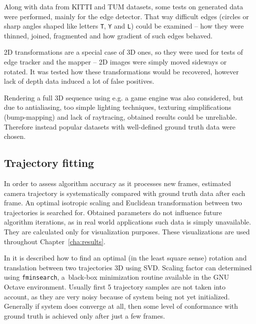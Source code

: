 Along with data from KITTI and TUM datasets, some tests on generated data were performed, mainly for the edge detector. That way difficult edges (circles or sharp angles shaped like letters \texttt{T}, \texttt{Y} and \texttt{L}) could be examined -- how they were thinned, joined, fragmented and how gradient of such edges behaved.

2D transformations are a special case of 3D ones, so they were used for tests of edge tracker and the mapper -- 2D images were simply moved sideways or rotated. It was tested how these transformations would be recovered, however lack of depth data induced a lot of false positives.

Rendering a full 3D sequence using e.g. a game engine was also considered, but due to antialiasing, too simple lighting techniques, texturing simplifications (bump-mapping) and lack of raytracing, obtained results could be unreliable. Therefore instead popular datasets with well-defined ground truth data were chosen.


\subsection{Trajectory fitting}
\label{sec:fitting}

In order to assess algorithm accuracy as it processes new frames, estimated camera trajectory is systematically compared with ground truth data after each frame. An optimal isotropic scaling and Euclidean transformation between two trajectories is searched for. Obtained parameters do not influence future algorithm iterations, as in real world applications such data is simply unavailable. They are calculated only for visualization purposes. These visualizations are used throughout Chapter~\ref{cha:results}.

In \cite{arun1987least} it is described how to find an optimal (in the least square sense) rotation and translation between two trajectories 3D using SVD. Scaling factor can determined using \texttt{fminsearch}, a~black-box minimization routine available in the GNU Octave environment. Usually first 5 trajectory samples are not taken into account, as they are very noisy because of system being not yet initialized. Generally if system does converge at all, then some level of conformance with ground truth is achieved only after just a few frames.

